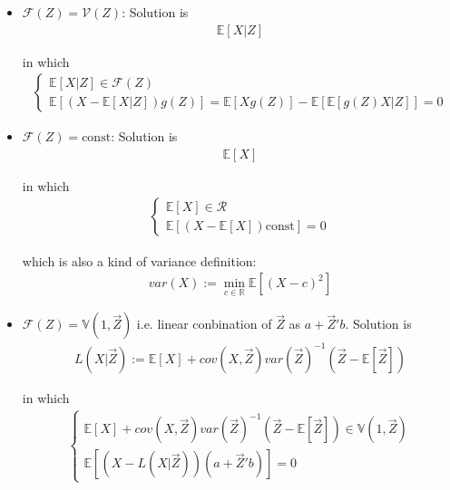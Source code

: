 \begin{itemize}[topsep=2pt,itemsep=0pt]
    \item $ \mathscr{F}(Z)=\mathscr{V}(Z) $: Solution is 
    \begin{align}
        \mathbb{E}\left[ X|Z \right] 
    \end{align}
    
    in which
    \begin{align}
        \begin{cases}
            \mathbb{E}\left[ X|Z \right] \in\mathscr{F}(Z)\\
            \mathbb{E}\left[(X-\mathbb{E}\left[ X|Z \right] )g(Z) \right]=\mathbb{E}\left[ Xg(Z) \right] -\mathbb{E}\left[ \mathbb{E}\left[ g(Z)X|Z \right]  \right] =0 
        \end{cases} 
    \end{align}
    \item $ \mathscr{F}(Z)=\mathrm{const} $: Solution is
    \begin{align}
         \mathbb{E}\left[ X \right]  
    \end{align}
    
    in which
    \begin{align}
        \begin{cases}
            \mathbb{E}\left[ X \right]\in \mathcal{R}\\
            \mathbb{E}\left[ (X-\mathbb{E}\left[ X \right] )\mathrm{const} \right]=0 
        \end{cases} 
    \end{align}

    which is also a kind of variance definition:
    \begin{align}
        var(X):=\min_{c\in\mathbb{R}}\mathbb{E}\left[ (X-c)^2 \right]  
    \end{align}
    
    \item \hypertarget{MMSELinear}{}$ \mathscr{F}(Z)=\mathbb{V}(1,\vec{Z}) $ i.e. linear conbination of $ \vec{Z} $ as $ a+\vec{Z}'b $. Solution is
    \begin{align}
        L(X|\vec{Z}):=\mathbb{E}\left[ X \right] +cov(X,\vec{Z})var(\vec{Z})^{-1}\left(\vec{Z}-\mathbb{E}\left[ \vec{Z} \right] \right)
    \end{align}
    
    in which
    \begin{align}
        \begin{cases}
            \mathbb{E}\left[ X \right] +cov(X,\vec{Z})var(\vec{Z})^{-1}\left(\vec{Z}-\mathbb{E}\left[ \vec{Z} \right] \right)\in \mathbb{V}(1,\vec{Z})\\
        \mathbb{E}\left[ (X-L(X|\vec{Z}))(a+\vec{Z}'b) \right] = 0
        \end{cases}
    \end{align}
    
\end{itemize}


